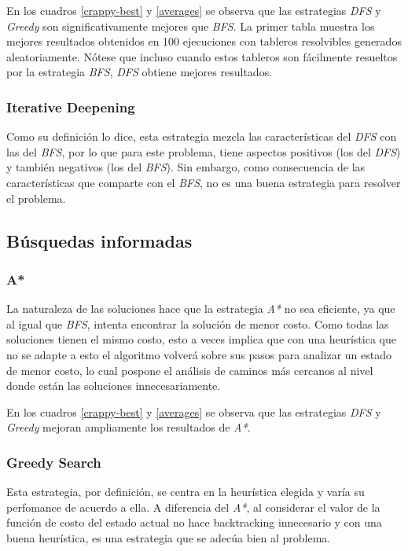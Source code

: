 \documentclass[a4paper,10pt]{article}
\begin{document}
\begin{itemize}
    En los cuadros \ref{crappy-best} y \ref{averages} se observa que las estrategias \textit{DFS} y \textit{Greedy} son significativamente mejores que \textit{BFS}. La primer tabla muestra los mejores resultados obtenidos en 100 ejecuciones con tableros resolvibles generados aleatoriamente. Nótese que incluso cuando estos tableros son fácilmente resueltos por la estrategia \textit{BFS}, \textit{DFS} obtiene mejores resultados.

    \subsubsection{Iterative Deepening}

    Como su definición lo dice, esta estrategia mezcla las características del \textit{DFS} con las del \textit{BFS}, por lo que para este problema, tiene aspectos positivos (los del \textit{DFS}) y también negativos (los del \textit{BFS}). Sin embargo, como consecuencia de las características que comparte con el \textit{BFS}, no es una buena estrategia para resolver el problema.

\subsection{Búsquedas informadas}
    
    \subsubsection{A*}
    
    La naturaleza de las soluciones hace que la estrategia \textit{A*} no sea eficiente, ya que al igual que \textit{BFS}, intenta encontrar la solución de menor costo. Como todas las soluciones tienen el mismo costo, esto a veces implica que con una heurística que no se adapte a esto el algoritmo volverá sobre sus pasos para analizar un estado de menor costo, lo cual pospone el análisis de caminos más cercanos al nivel donde están las soluciones innecesariamente.

    En los cuadros \ref{crappy-best} y \ref{averages} se observa que las estrategias \textit{DFS} y \textit{Greedy} mejoran ampliamente los resultados de \textit{A*}.

    \subsubsection{Greedy Search}
    
    Esta estrategia, por definición, se centra en la heurística elegida y varía su perfomance de acuerdo a ella. A diferencia del \textit{A*}, al considerar el valor de la función de costo del estado actual no hace backtracking innecesario y con una buena heurística, es una estrategia que se adecúa bien al problema.


\end{itemize}
\end{document}

